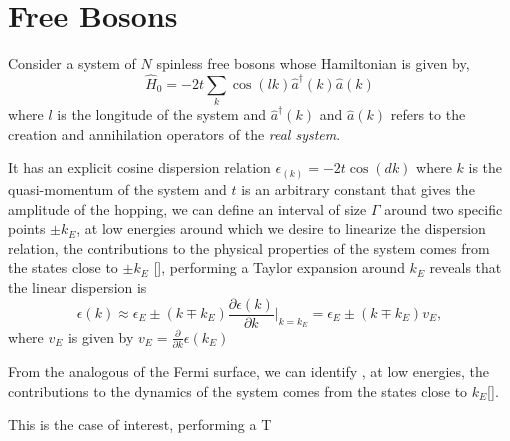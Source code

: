 \section{Free Bosons}

Consider a system of $N$ spinless free bosons whose Hamiltonian is given by,
\begin{equation} \label{eq_hamiltonian_free_bosons}
    \hat{H}_0 = -2t \sum_k \cos{(lk)} \hat{a}^{\dagger}(k) \hat{a}(k)
\end{equation}
where $l$ is the longitude of the system and  $\hat{a}^{\dagger}(k) $ and $\hat{a}(k) $ refers to the creation and annihilation operators of the \textit{real system}. 

It has an explicit cosine dispersion relation $\epsilon_(k)=-2t\cos{(dk)}$ where $k$ is the quasi-momentum of the system and $t$ is an arbitrary constant that gives the amplitude of the hopping, we can define an interval of size $\Gamma$ around two specific points $\pm k_E$,  at low energies around which we desire to linearize the dispersion relation, the contributions to the physical properties of the system comes from the states close to $\pm k_E$ [], performing a Taylor expansion around $k_E$ reveals that the linear dispersion is
\begin{equation} \label{eq_dispersion_relation}
    \epsilon(k) \approx \epsilon_{E} \pm\left(k \mp k_{E}\right) \frac{\partial \epsilon (k)}{\partial k} \bigg|_{k=k_E} = \epsilon_{E} \pm\left(k \mp k_{E}\right) v_{E},
\end{equation}
where $v_E$ is given by $v_E =\frac{\partial}{\partial k} \epsilon (k_E) $

From the analogous of the Fermi surface, we can identify , at low energies, the contributions  to the dynamics of the system comes from the states close to $k_E$[].
\newpage


This is the case of interest, performing a T



